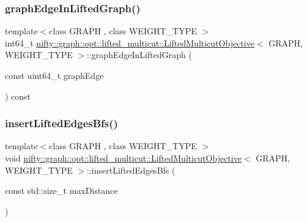 \subsubsection{\texorpdfstring{graph\+Edge\+In\+Lifted\+Graph()}{graphEdgeInLiftedGraph()}}
{\footnotesize\ttfamily template$<$class G\+R\+A\+PH , class W\+E\+I\+G\+H\+T\+\_\+\+T\+Y\+PE $>$ \\
int64\+\_\+t \hyperlink{classnifty_1_1graph_1_1opt_1_1lifted__multicut_1_1LiftedMulticutObjective}{nifty\+::graph\+::opt\+::lifted\+\_\+multicut\+::\+Lifted\+Multicut\+Objective}$<$ G\+R\+A\+PH, W\+E\+I\+G\+H\+T\+\_\+\+T\+Y\+PE $>$\+::graph\+Edge\+In\+Lifted\+Graph (\begin{DoxyParamCaption}\item[{const uint64\+\_\+t}]{graph\+Edge }\end{DoxyParamCaption}) const\hspace{0.3cm}{\ttfamily [inline]}}

\mbox{\label{classnifty_1_1graph_1_1opt_1_1lifted__multicut_1_1LiftedMulticutObjective_a9d8574eee3c7e8f4e39bb9d20f3db481}} 
\subsubsection{\texorpdfstring{insert\+Lifted\+Edges\+Bfs()}{insertLiftedEdgesBfs()}\hspace{0.1cm}{\footnotesize\ttfamily [1/2]}}
{\footnotesize\ttfamily template$<$class G\+R\+A\+PH , class W\+E\+I\+G\+H\+T\+\_\+\+T\+Y\+PE $>$ \\
void \hyperlink{classnifty_1_1graph_1_1opt_1_1lifted__multicut_1_1LiftedMulticutObjective}{nifty\+::graph\+::opt\+::lifted\+\_\+multicut\+::\+Lifted\+Multicut\+Objective}$<$ G\+R\+A\+PH, W\+E\+I\+G\+H\+T\+\_\+\+T\+Y\+PE $>$\+::insert\+Lifted\+Edges\+Bfs (\begin{DoxyParamCaption}\item[{const std\+::size\+\_\+t}]{max\+Distance }\end{DoxyParamCaption})\hspace{0.3cm}{\ttfamily [inline]}}

